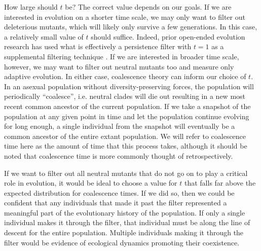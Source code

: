 \documentclass[letterpaper]{article}
\begin{document}
How large should $t$ be? The correct value depends on our goals. If we are interested in evolution on a shorter time scale, we may only want to filter out deleterious mutants, which will likely only survive a few generations. In this case, a relatively small value of $t$ should suffice. Indeed, prior open-ended evolution research has used what is effectively a persistence filter with $t = 1$ as a supplemental filtering technique \citep{channon_improving_2003}. If we are interested in broader time scale, however, we may want to filter out neutral mutants too and measure only adaptive evolution. In either case, coalescence theory can inform our choice of $t$. In an asexual population without diversity-preserving forces, the population will periodically ``coalesce'', i.e. neutral clades will die out resulting in a new most recent common ancestor of the current population. If we take a snapshot of the population at any given point in time and let the population continue evolving for long enough,  a single individual from the snapshot will eventually be a common ancestor of the entire extant population. We will refer to coalescence time here as the amount of time that this process takes, although it should be noted that coalescence time is more commonly thought of retrospectively. 

If we want to filter out all neutral mutants that do not go on to play a critical role in evolution, it would be ideal to choose a value for $t$ that falls far above the expected distribution for coalescence times. If we did so, then we could be confident that any individuals that made it past the filter represented a meaningful part of the evolutionary history of the population. If only a single individual makes it through the filter, that individual must be along the line of descent for the entire population. Multiple individuals making it through the filter would be evidence of ecological dynamics promoting their coexistence.
    
\end{document}

